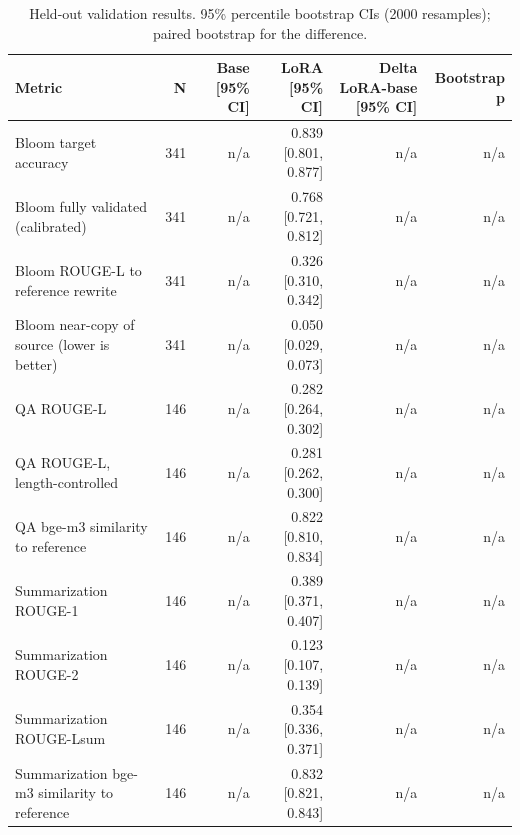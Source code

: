 \begin{table}[t]
\centering
\caption{Held-out validation results. 95\% percentile bootstrap CIs (2000 resamples); paired bootstrap for the difference.}
\label{tab:t3_main_results}
\begin{tabular}{lrrrrr}
\toprule
Metric & N & Base [95\% CI] & LoRA [95\% CI] & Delta LoRA-base [95\% CI] & Bootstrap p \\
\midrule
Bloom target accuracy & 341 & n/a & 0.839 [0.801, 0.877] & n/a & n/a \\
Bloom fully validated (calibrated) & 341 & n/a & 0.768 [0.721, 0.812] & n/a & n/a \\
Bloom ROUGE-L to reference rewrite & 341 & n/a & 0.326 [0.310, 0.342] & n/a & n/a \\
Bloom near-copy of source (lower is better) & 341 & n/a & 0.050 [0.029, 0.073] & n/a & n/a \\
QA ROUGE-L & 146 & n/a & 0.282 [0.264, 0.302] & n/a & n/a \\
QA ROUGE-L, length-controlled & 146 & n/a & 0.281 [0.262, 0.300] & n/a & n/a \\
QA bge-m3 similarity to reference & 146 & n/a & 0.822 [0.810, 0.834] & n/a & n/a \\
Summarization ROUGE-1 & 146 & n/a & 0.389 [0.371, 0.407] & n/a & n/a \\
Summarization ROUGE-2 & 146 & n/a & 0.123 [0.107, 0.139] & n/a & n/a \\
Summarization ROUGE-Lsum & 146 & n/a & 0.354 [0.336, 0.371] & n/a & n/a \\
Summarization bge-m3 similarity to reference & 146 & n/a & 0.832 [0.821, 0.843] & n/a & n/a \\
\bottomrule
\end{tabular}
\end{table}
